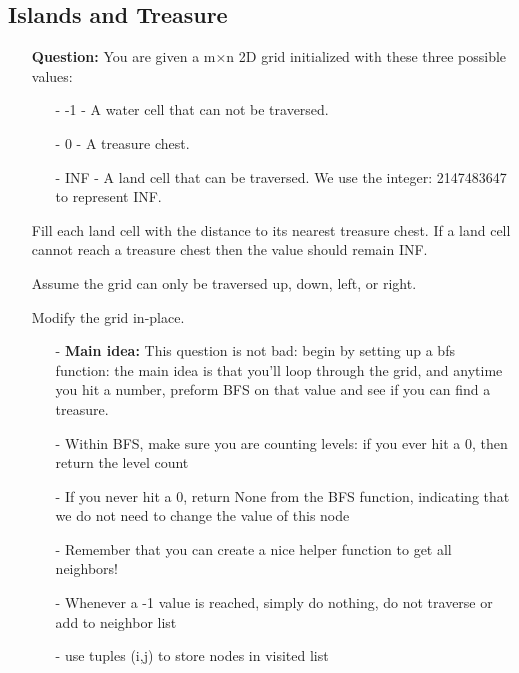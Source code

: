 \documentclass[12pt]{article}
\begin{document}
\subsection{Islands and Treasure}
\begin{enumerate}
  \item[] \textbf{Question:} You are given a m×n 2D grid initialized with these three possible values:

\begin{enumerate}
  \item[-] -1 - A water cell that can not be traversed.
  \item[-] 0 - A treasure chest.
  \item[-] INF - A land cell that can be traversed. We use the integer: 2147483647 to represent INF.
\end{enumerate}

Fill each land cell with the distance to its nearest treasure chest. If a land cell cannot reach a treasure chest then the value should remain INF.

Assume the grid can only be traversed up, down, left, or right.

Modify the grid in-place.


    \begin{enumerate}
      \item[-] \textbf{Main idea:} This question is not bad: begin by setting up a bfs function: the main idea is that you'll loop through the grid, and anytime you hit a number, preform BFS on that value and see if you can find a treasure.
      \item[-] Within BFS, make sure you are counting levels: if you ever hit a 0, then return the level count
      \item[-] If you never hit a 0, return None from the BFS function, indicating that we do not need to change the value of this node
      \item[-] Remember that you can create a nice helper function to get all neighbors!
      \item[-] Whenever a -1 value is reached, simply do nothing, do not traverse or add to neighbor list
      \item[-] use tuples (i,j) to store nodes in visited list
    \end{enumerate}
\end{enumerate}
\end{document}
